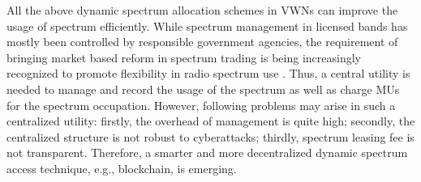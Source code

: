 \documentclass[journal]{IEEEtran}
\begin{document}
All the above dynamic spectrum allocation schemes in VWNs can improve the usage of spectrum efficiently. While spectrum management in licensed bands has
mostly been controlled by responsible government agencies, the requirement of bringing market based reform in spectrum trading is being increasingly recognized to promote flexibility in radio spectrum use \cite{FBltr}. Thus, a central utility is needed to manage and record the usage of the spectrum as well as charge MUs for the spectrum occupation. However, following problems may arise in such a centralized utility: firstly, the overhead of management is quite high; secondly, the centralized structure is not robust to cyberattacks; thirdly, spectrum leasing fee is not transparent. Therefore, a smarter and more decentralized dynamic spectrum access technique, e.g., blockchain, is emerging.
\end{document}
